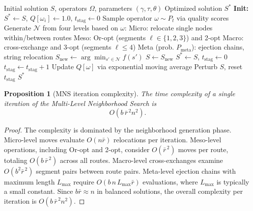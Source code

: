 \documentclass[preprint,12pt,authoryear]{elsarticle}
\newtheorem{proposition}{Proposition}
\theoremstyle{definition}
\begin{document}
\begin{algorithm}[t]
\caption{Multi-Level Neighborhood Search}
\label{alg:MNS}
\begin{algorithmic}[1]
\Require Initial solution $S$, operators $\Omega$, parameters $(\gamma, \tau, \theta)$
\Ensure Optimized solution $S^*$
\State \textbf{Init:} $S^* \leftarrow S$, $Q[\omega_i] \leftarrow 1.0$, $t_{\text{stag}} \leftarrow 0$
    \State Sample operator $\omega \sim P_t$ via quality scores
    \State Generate $\mathcal{N}$ from four levels based on $\omega$:
    \State \quad Micro: relocate single nodes within/between routes
    \State \quad Meso: Or-opt (segments $\ell \in \{1,2,3\}$) and 2-opt
    \State \quad Macro: cross-exchange and 3-opt (segments $\ell \leq 4$)
    \State \quad Meta (prob. $P_{\text{meta}}$): ejection chains, string relocation
    \State $S_{\text{new}} \leftarrow \arg\min_{s' \in \mathcal{N}} f(s')$
        \State $S \leftarrow S_{\text{new}}$
         $S^* \leftarrow S$, $t_{\text{stag}} \leftarrow 0$
        \EndIf
    \Else\ $t_{\text{stag}} \leftarrow t_{\text{stag}} + 1$
    \EndIf
    \State Update $Q[\omega]$ via exponential moving average
     Perturb $S$, reset $t_{\text{stag}}$
    \EndIf
\EndWhile
\State \Return $S^*$
\end{algorithmic}
\end{algorithm}

\begin{proposition}[MNS iteration complexity]\label{prop4}
The time complexity of a single iteration of the Multi-Level Neighborhood Search is
\[
O\!\left(b\,\bar{r}^{\,2} n^{2}\right).
\]
\end{proposition}

\begin{proof}
The complexity is dominated by the neighborhood generation phase. Micro-level moves evaluate
$O(n\bar{r})$ relocations per iteration. Meso-level operations, including Or-opt and 2-opt, consider
$O(\bar{r}^{\,2})$ moves per route, totaling $
O(b\,\bar{r}^{\,2}) $ across all routes. Macro-level cross-exchanges examine $O(b^{2}\bar{r}^{\,2})$ segment pairs between route pairs. Meta-level ejection chains with maximum length $L_{\max}$ require $O(b\,n\,L_{\max}\bar{r})$
evaluations, where $L_{\max}$ is typically a small constant. Since $b\bar{r} \approx n$ in balanced solutions, the overall complexity per iteration is
$O\!\left(b\,\bar{r}^{\,2} n^{2}\right).$
\end{proof}
\end{document}
